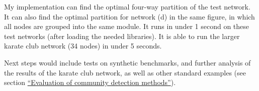 My implementation can find the optimal four-way partition of the test
network. It can also find the optimal partition for network (d) in the
same figure, in which all nodes are grouped into the same module. It
runs in under 1 second on these test networks (after loading the needed
libraries). It is able to run the larger karate club network (34 nodes)
in under 5 seconds.

Next steps would include tests on synthetic benchmarks, and further
analysis of the results of the karate club network, as well as other
standard examples (see section
\protect\hyperlink{evaluation}{``Evaluation of community detection
methods''}).
